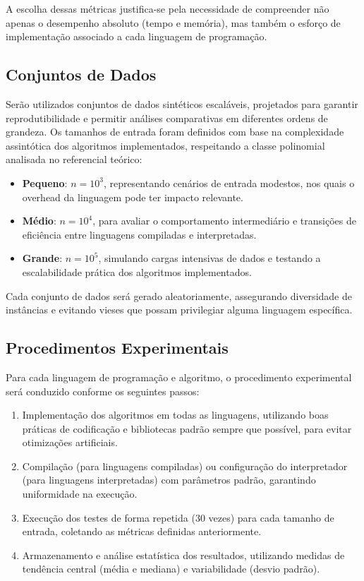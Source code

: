 \documentclass[12pt, a4paper]{article}
\begin{document}
A escolha dessas métricas justifica-se pela necessidade de compreender não apenas o desempenho absoluto (tempo e memória), mas também o esforço de implementação associado a cada linguagem de programação.

\subsection{Conjuntos de Dados}

Serão utilizados conjuntos de dados sintéticos escaláveis, projetados para garantir reprodutibilidade e permitir análises comparativas em diferentes ordens de grandeza. Os tamanhos de entrada foram definidos com base na complexidade assintótica dos algoritmos implementados, respeitando a classe polinomial analisada no referencial teórico:

\begin{itemize}
    \item \textbf{Pequeno}: \( n = 10^3 \), representando cenários de entrada modestos, nos quais o overhead da linguagem pode ter impacto relevante.
    \item \textbf{Médio}: \( n = 10^4 \), para avaliar o comportamento intermediário e transições de eficiência entre linguagens compiladas e interpretadas.
    \item \textbf{Grande}: \( n = 10^5 \), simulando cargas intensivas de dados e testando a escalabilidade prática dos algoritmos implementados.
\end{itemize}

Cada conjunto de dados será gerado aleatoriamente, assegurando diversidade de instâncias e evitando vieses que possam privilegiar alguma linguagem específica.

\subsection{Procedimentos Experimentais}

Para cada linguagem de programação e algoritmo, o procedimento experimental será conduzido conforme os seguintes passos:

\begin{enumerate}
    \item Implementação dos algoritmos em todas as linguagens, utilizando boas práticas de codificação e bibliotecas padrão sempre que possível, para evitar otimizações artificiais.
    \item Compilação (para linguagens compiladas) ou configuração do interpretador (para linguagens interpretadas) com parâmetros padrão, garantindo uniformidade na execução.
    \item Execução dos testes de forma repetida (30 vezes) para cada tamanho de entrada, coletando as métricas definidas anteriormente.
    \item Armazenamento e análise estatística dos resultados, utilizando medidas de tendência central (média e mediana) e variabilidade (desvio padrão).
\end{enumerate}
\end{document}
